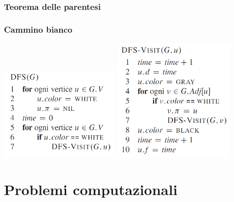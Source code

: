\documentclass{article}
\begin{document}
\subsubsection*{Teorema delle parentesi}
\subsubsection*{Cammino bianco}

\begin{center}
  \includegraphics[width=0.45\textwidth]{dfs_algo.png}
  \includegraphics[width=0.45\textwidth]{dfs_visit_algo.png}
\end{center}

\pagebreak

\section{Problemi computazionali}
\end{document}
